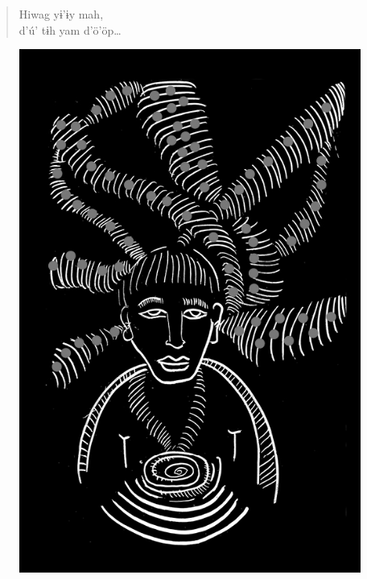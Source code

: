 \begin{verse}
Hiwag yɨ’ɨy mah,\\
d’ú’ tɨh yam d’ö’öp\ldots{}
\end{verse}

\vspace*{\fill}

\begin{figure}
\vspace*{-1.2cm}
\hspace*{-2.2cm}\includegraphics[width=138mm]{./imgs/img4.jpg}
\end{figure}

\chapter*{}

